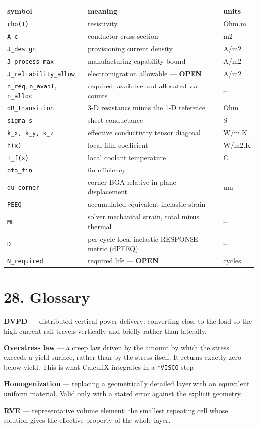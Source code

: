 \documentclass[10pt,]{article}
\begin{document}
\begin{longtable}[]{@{}lll@{}}
\toprule
symbol & meaning & units\tabularnewline
\midrule
\endhead
\texttt{rho(T)} & resistivity & Ohm.m\tabularnewline
\texttt{A\_c} & conductor cross-section & m2\tabularnewline
\texttt{J\_design} & provisioning current density & A/m2\tabularnewline
\texttt{J\_process\_max} & manufacturing capability bound &
A/m2\tabularnewline
\texttt{J\_reliability\_allow} & electromigration allowable ---
\textbf{OPEN} & A/m2\tabularnewline
\texttt{n\_req}, \texttt{n\_avail}, \texttt{n\_alloc} & required,
available and allocated via counts & --\tabularnewline
\texttt{dR\_transition} & 3-D resistance minus the 1-D reference &
Ohm\tabularnewline
\texttt{sigma\_s} & sheet conductance & S\tabularnewline
\texttt{k\_x,\ k\_y,\ k\_z} & effective conductivity tensor diagonal &
W/m.K\tabularnewline
\texttt{h(x)} & local film coefficient & W/m2.K\tabularnewline
\texttt{T\_f(x)} & local coolant temperature & C\tabularnewline
\texttt{eta\_fin} & fin efficiency & --\tabularnewline
\texttt{du\_corner} & corner-BGA relative in-plane displacement &
um\tabularnewline
\texttt{PEEQ} & accumulated equivalent inelastic strain &
--\tabularnewline
\texttt{ME} & solver mechanical strain, total minus thermal &
--\tabularnewline
\texttt{D} & per-cycle local inelastic RESPONSE metric (dPEEQ) &
--\tabularnewline
\texttt{N\_required} & required life --- \textbf{OPEN} &
cycles\tabularnewline
\bottomrule
\end{longtable}

\hypertarget{glossary}{%
\section{28. Glossary}\label{glossary}}

\textbf{DVPD} --- distributed vertical power delivery: converting close
to the load so the high-current rail travels vertically and briefly
rather than laterally.

\textbf{Overstress law} --- a creep law driven by the amount by which
the stress exceeds a yield surface, rather than by the stress itself. It
returns exactly zero below yield. This is what CalculiX integrates in a
\texttt{*VISCO} step.

\textbf{Homogenization} --- replacing a geometrically detailed layer
with an equivalent uniform material. Valid only with a stated error
against the explicit geometry.

\textbf{RVE} --- representative volume element: the smallest repeating
cell whose solution gives the effective property of the whole layer.
\end{document}
